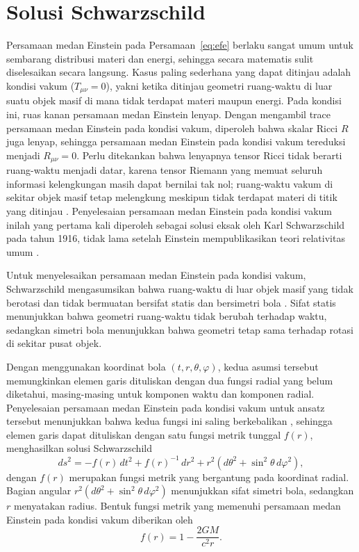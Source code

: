 \section{Solusi Schwarzschild}
\label{sec:solusi-schwarzschild}

\noindent Persamaan medan Einstein pada Persamaan~\eqref{eq:efe} berlaku sangat umum untuk 
sembarang distribusi materi dan energi, sehingga secara matematis sulit diselesaikan secara 
langsung. Kasus paling sederhana yang dapat ditinjau adalah kondisi vakum ($T_{\mu\nu} = 0$), 
yakni ketika ditinjau geometri ruang-waktu di luar suatu objek masif di mana tidak terdapat 
materi maupun energi. Pada kondisi ini, ruas kanan persamaan medan Einstein lenyap. Dengan mengambil trace 
persamaan medan Einstein pada kondisi vakum, diperoleh bahwa skalar Ricci $R$ juga 
lenyap, sehingga persamaan medan Einstein pada kondisi vakum tereduksi menjadi 
$R_{\mu\nu} = 0$. Perlu ditekankan bahwa lenyapnya tensor Ricci 
tidak berarti ruang-waktu menjadi datar, karena tensor Riemann yang memuat seluruh informasi 
kelengkungan masih dapat bernilai tak nol; ruang-waktu vakum di sekitar objek masif tetap 
melengkung meskipun tidak terdapat materi di titik yang ditinjau \parencite{Carroll2004}. 
Penyelesaian persamaan medan Einstein pada kondisi vakum inilah yang pertama kali diperoleh 
sebagai solusi eksak oleh Karl Schwarzschild pada tahun 1916, tidak lama setelah Einstein 
mempublikasikan teori relativitas umum \parencite{Schwarzschild1916}.

Untuk menyelesaikan persamaan medan Einstein pada kondisi vakum, Schwarzschild mengasumsikan bahwa ruang-waktu di luar objek masif yang tidak berotasi dan tidak bermuatan bersifat statis dan bersimetri bola \parencite{Wald1984,Carroll2004}. Sifat statis menunjukkan bahwa geometri ruang-waktu tidak berubah terhadap waktu, sedangkan simetri bola menunjukkan bahwa geometri tetap sama terhadap rotasi di sekitar pusat objek.

Dengan menggunakan koordinat bola $(t,r,\theta,\varphi)$, kedua asumsi tersebut memungkinkan elemen garis dituliskan dengan dua fungsi radial yang belum diketahui, masing-masing untuk komponen waktu dan komponen radial. Penyelesaian persamaan medan Einstein pada kondisi vakum untuk ansatz tersebut menunjukkan bahwa kedua fungsi ini saling berkebalikan \parencite{Wald1984}, sehingga elemen garis dapat dituliskan dengan satu fungsi metrik tunggal $f(r)$, menghasilkan solusi Schwarzschild
\begin{equation}
ds^2=-f(r)\,dt^2+f(r)^{-1}\,dr^2+r^2\left(d\theta^2+\sin^2\theta\,d\varphi^2\right),
\label{eq:metrik-schwarzschild}
\end{equation}
dengan $f(r)$ merupakan fungsi metrik yang bergantung pada koordinat radial. Bagian angular $r^2(d\theta^2+\sin^2\theta\,d\varphi^2)$ menunjukkan sifat simetri bola, sedangkan $r$ menyatakan radius. Bentuk fungsi metrik yang memenuhi persamaan medan Einstein pada kondisi vakum diberikan oleh
\begin{equation}
f(r)=1-\frac{2GM}{c^2r}.
\label{eq:fungsi-metrik-si}
\end{equation}

